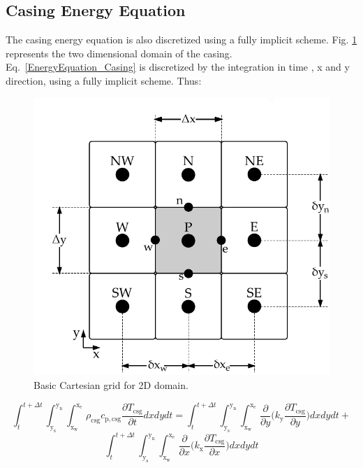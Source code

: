 \documentclass[review,preprint,12pt]{elsarticle}
\begin{document}
\subsection{Casing Energy Equation}
\label{sec:disc-casing}

The casing energy equation is also discretized using a fully implicit scheme. Fig. \ref{fig:2D_grid} represents the two dimensional domain of the casing. Eq.~\eqref{EnergyEquation_Casing} is discretized  by the integration in time , x and y direction, using a fully implicit scheme. Thus:

\begin{figure}[!ht]
  \centering
  \includegraphics[scale=0.8]{2D_grid.pdf}
  \caption{Basic Cartesian grid for 2D domain.}
  \label{fig:2D_grid}
\end{figure}

\begin{equation}
\int_{t}^{t+\Delta t}\int_\mathrm{y_s}^\mathrm{y_n}\int_\mathrm{x_w}^\mathrm{x_e} \rho_\textrm{csg} c_\mathrm{p,csg}\frac{\partial T_\textrm{csg}}{\partial t}dxdydt = \int_{t}^{t+\Delta t}\int_\mathrm{y_s}^\mathrm{y_n}\int_\mathrm{x_w}^\mathrm{x_e}\frac{\partial}{\partial y}\Bigg(k_\mathrm{y}\frac{\partial T_\textrm{csg}}{\partial y}\Bigg) dxdy dt + \nonumber
\end{equation}
\begin{equation}
\int_{t}^{t+\Delta t}\int_\mathrm{y_s}^\mathrm{y_n}\int_\mathrm{x_w}^\mathrm{x_e}\frac{\partial}{\partial x}\Bigg(k_\mathrm{x}\frac{\partial T_\textrm{csg}}{\partial x}\Bigg)dxdy dt
\label{2D_disc}
\end{equation}
\end{document}
